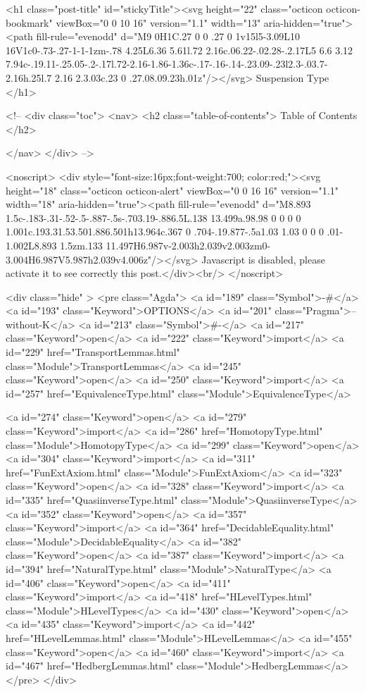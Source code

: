   <h1 class="post-title" id="stickyTitle"><svg height="22" class="octicon octicon-bookmark" viewBox="0 0 10 16" version="1.1" width="13" aria-hidden="true"><path fill-rule="evenodd" d="M9 0H1C.27 0 0 .27 0 1v15l5-3.09L10 16V1c0-.73-.27-1-1-1zm-.78 4.25L6.36 5.61l.72 2.16c.06.22-.02.28-.2.17L5 6.6 3.12 7.94c-.19.11-.25.05-.2-.17l.72-2.16-1.86-1.36c-.17-.16-.14-.23.09-.23l2.3-.03.7-2.16h.25l.7 2.16 2.3.03c.23 0 .27.08.09.23h.01z"/></svg> Suspension Type
  </h1>

  <!-- 
  <div class="toc">
    <nav>
    <h2 class="table-of-contents"> Table of Contents </h2>
      

    </nav>
  </div>
   -->

  <noscript>
  <div style="font-size:16px;font-weight:700; color:red;"><svg height="18" class="octicon octicon-alert" viewBox="0 0 16 16" version="1.1" width="18" aria-hidden="true"><path fill-rule="evenodd" d="M8.893 1.5c-.183-.31-.52-.5-.887-.5s-.703.19-.886.5L.138 13.499a.98.98 0 0 0 0 1.001c.193.31.53.501.886.501h13.964c.367 0 .704-.19.877-.5a1.03 1.03 0 0 0 .01-1.002L8.893 1.5zm.133 11.497H6.987v-2.003h2.039v2.003zm0-3.004H6.987V5.987h2.039v4.006z"/></svg> Javascript is disabled, please activate it to see correctly this post.</div><br/>
  </noscript>

  <div class="hide" >
<pre class="Agda">
<a id="189" class="Symbol">{-#</a> <a id="193" class="Keyword">OPTIONS</a> <a id="201" class="Pragma">--without-K</a> <a id="213" class="Symbol">#-}</a>
<a id="217" class="Keyword">open</a> <a id="222" class="Keyword">import</a> <a id="229" href="TransportLemmas.html" class="Module">TransportLemmas</a>
<a id="245" class="Keyword">open</a> <a id="250" class="Keyword">import</a> <a id="257" href="EquivalenceType.html" class="Module">EquivalenceType</a>

<a id="274" class="Keyword">open</a> <a id="279" class="Keyword">import</a> <a id="286" href="HomotopyType.html" class="Module">HomotopyType</a>
<a id="299" class="Keyword">open</a> <a id="304" class="Keyword">import</a> <a id="311" href="FunExtAxiom.html" class="Module">FunExtAxiom</a>
<a id="323" class="Keyword">open</a> <a id="328" class="Keyword">import</a> <a id="335" href="QuasiinverseType.html" class="Module">QuasiinverseType</a>
<a id="352" class="Keyword">open</a> <a id="357" class="Keyword">import</a> <a id="364" href="DecidableEquality.html" class="Module">DecidableEquality</a>
<a id="382" class="Keyword">open</a> <a id="387" class="Keyword">import</a> <a id="394" href="NaturalType.html" class="Module">NaturalType</a>
<a id="406" class="Keyword">open</a> <a id="411" class="Keyword">import</a> <a id="418" href="HLevelTypes.html" class="Module">HLevelTypes</a>
<a id="430" class="Keyword">open</a> <a id="435" class="Keyword">import</a> <a id="442" href="HLevelLemmas.html" class="Module">HLevelLemmas</a>
<a id="455" class="Keyword">open</a> <a id="460" class="Keyword">import</a> <a id="467" href="HedbergLemmas.html" class="Module">HedbergLemmas</a>
</pre>
</div>


